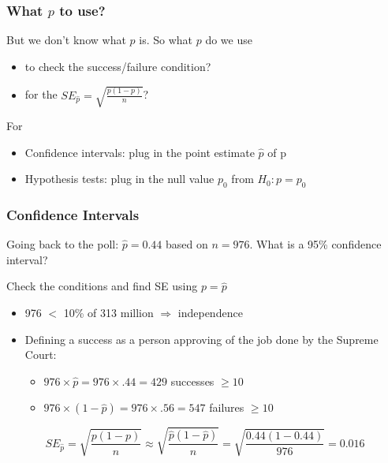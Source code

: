 \documentclass[handout]{beamer}
\newcommand{\blue}[1]{\textcolor{blue2}{#1}}
\newcommand{\phat}{\widehat{p}}
\begin{document}
\begin{frame}[fragile]
\frametitle{What $p$ to use?}

%
%
But we \blue{don't know} what $p$ is.  So what $p$ do we use
\begin{itemize}
\item to check the success/failure condition?
\item for the $SE_{\phat} = \sqrt{\frac{p(1-p)}{n}}$?
\end{itemize}

\vspace{0.5cm}
For
\begin{itemize}
\pause \item Confidence intervals: plug in the \blue{point estimate} $\phat$ of p
\pause \item Hypothesis tests: plug in the \blue{null value} $p_0$ from $H_0: p=p_0$
\end{itemize}

\end{frame}


\begin{frame}[fragile]
\frametitle{Confidence Intervals}

%
%
Going back to the poll: $\phat=0.44$ based on $n=976$.  What is a 95\% confidence interval?

\vspace{0.25cm}

\pause Check the conditions and find SE \blue{using $p=\phat$}

\begin{itemize}
\pause \item 976 $<$ 10\% of 313 million $\Rightarrow$ independence
\pause \item Defining a success as a person approving of the job done by the Supreme Court:
\pause
\begin{itemize}
\item $976 \times \phat = 976 \times .44 = 429$ successes $\geq 10$
\item $976 \times (1-\phat) = 976 \times .56 = 547$ failures $\geq 10$
\end{itemize}
\end{itemize}
\pause
\[
SE_{\phat} = \sqrt{\frac{p(1-p)}{n}} \approx \sqrt{\frac{\phat(1-\phat)}{n}} = \sqrt{\frac{0.44(1-0.44)}{976}} = 0.016
\]
\end{frame}
\end{document}
